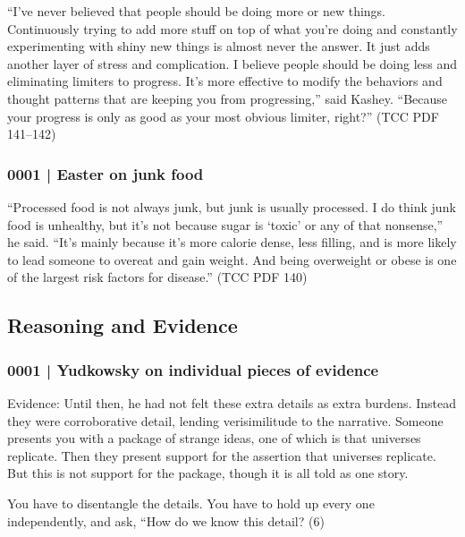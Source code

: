 			``I've never believed that people should be doing more or new things. Continuously trying to add more stuff on top of what you're doing and constantly experimenting with shiny new things is almost never the answer. It just adds another layer of stress and complication. I believe people should be doing less and eliminating limiters to progress. It's more effective to modify the behaviors and thought patterns that are keeping you from progressing,'' said Kashey. ``Because your progress is only as good as your most obvious limiter, right?'' (TCC PDF 141--142)
			
		\subsubsection{0001 | Easter on junk food}
			\label{GM-LIFE-FOOD-0002}
			
			``Processed food is not always junk, but junk is usually processed. I do think junk food is unhealthy, but it's not because sugar is ‘toxic' or any of that nonsense,'' he said. ``It's mainly because it's more calorie dense, less filling, and is more likely to lead someone to overeat and gain weight. And being overweight or obese is one of the largest risk factors for disease.'' (TCC PDF 140)
				
	\subsection{Reasoning and Evidence} %
		\label{GM-LIFE-REASONING}
		
		\subsubsection{0001 | Yudkowsky on individual pieces of evidence}
			\label{GM-LIFE-REASONING-0001}
			
			Evidence: Until then, he had not felt these extra details as extra burdens. Instead they were corroborative detail, lending verisimilitude to the narrative. Someone presents you with a package of strange ideas, one of which is that universes replicate. Then they present support for the assertion that universes replicate. But this is not support for the package, though it is all told as one story.

			You have to disentangle the details. You have to hold up every one independently, and ask, ``How do we know this detail? (6)
			
